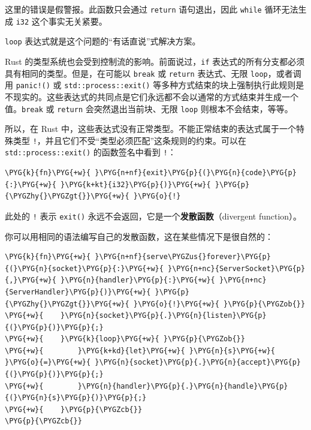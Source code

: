 这里的错误是假警报。此函数只会通过 \texttt{return} 语句退出，因此 \texttt{while} 循环无法生成 \texttt{i32} 这个事实无关紧要。

\texttt{loop} 表达式就是这个问题的“有话直说”式解决方案。

Rust 的类型系统也会受到控制流的影响。前面说过，\texttt{if} 表达式的所有分支都必须具有相同的类型。但是，在可能以 \texttt{break} 或 \texttt{return} 表达式、无限 \texttt{loop}，或者调用 \texttt{panic!()} 或 \texttt{std::process::exit()} 等多种方式结束的块上强制执行此规则是不现实的。这些表达式的共同点是它们永远都不会以通常的方式结束并生成一个值。\texttt{break} 或 \texttt{return} 会突然退出当前块、无限 \texttt{loop} 则根本不会结束，等等。

所以，在 Rust 中，这些表达式没有正常类型。不能正常结束的表达式属于一个特殊类型 \texttt{!}，并且它们不受“类型必须匹配”这条规则的约束。可以在 \texttt{std::process::exit()} 的函数签名中看到 \texttt{!}：

\begin{Verbatim}[commandchars=\\\{\},breaklines=true,breakanywhere=true,fontsize=\codefont,xleftmargin=17bp]
\PYG{k}{fn}\PYG{+w}{ }\PYG{n+nf}{exit}\PYG{p}{(}\PYG{n}{code}\PYG{p}{:}\PYG{+w}{ }\PYG{k+kt}{i32}\PYG{p}{)}\PYG{+w}{ }\PYG{p}{\PYGZhy{}\PYGZgt{}}\PYG{+w}{ }\PYG{o}{!}
\end{Verbatim}

此处的 \texttt{!} 表示 \texttt{exit()} 永远不会返回，它是一个\textbf{发散函数}（divergent function）。

你可以用相同的语法编写自己的发散函数，这在某些情况下是很自然的：

\begin{Verbatim}[commandchars=\\\{\},breaklines=true,breakanywhere=true,fontsize=\codefont,xleftmargin=17bp]
\PYG{k}{fn}\PYG{+w}{ }\PYG{n+nf}{serve\PYGZus{}forever}\PYG{p}{(}\PYG{n}{socket}\PYG{p}{:}\PYG{+w}{ }\PYG{n+nc}{ServerSocket}\PYG{p}{,}\PYG{+w}{ }\PYG{n}{handler}\PYG{p}{:}\PYG{+w}{ }\PYG{n+nc}{ServerHandler}\PYG{p}{)}\PYG{+w}{ }\PYG{p}{\PYGZhy{}\PYGZgt{}}\PYG{+w}{ }\PYG{o}{!}\PYG{+w}{ }\PYG{p}{\PYGZob{}}
\PYG{+w}{    }\PYG{n}{socket}\PYG{p}{.}\PYG{n}{listen}\PYG{p}{(}\PYG{p}{)}\PYG{p}{;}
\PYG{+w}{    }\PYG{k}{loop}\PYG{+w}{ }\PYG{p}{\PYGZob{}}
\PYG{+w}{        }\PYG{k+kd}{let}\PYG{+w}{ }\PYG{n}{s}\PYG{+w}{ }\PYG{o}{=}\PYG{+w}{ }\PYG{n}{socket}\PYG{p}{.}\PYG{n}{accept}\PYG{p}{(}\PYG{p}{)}\PYG{p}{;}
\PYG{+w}{        }\PYG{n}{handler}\PYG{p}{.}\PYG{n}{handle}\PYG{p}{(}\PYG{n}{s}\PYG{p}{)}\PYG{p}{;}
\PYG{+w}{    }\PYG{p}{\PYGZcb{}}
\PYG{p}{\PYGZcb{}}
\end{Verbatim}

